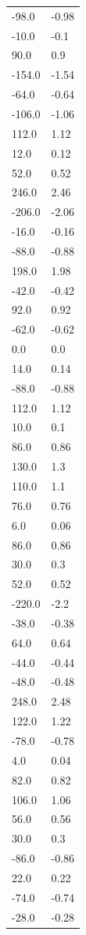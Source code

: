 \begin{longtable}{ll}
-98.0 & -0.98 \\
-10.0 & -0.1 \\
90.0 & 0.9 \\
-154.0 & -1.54 \\
-64.0 & -0.64 \\
-106.0 & -1.06 \\
112.0 & 1.12 \\
12.0 & 0.12 \\
52.0 & 0.52 \\
246.0 & 2.46 \\
-206.0 & -2.06 \\
-16.0 & -0.16 \\
-88.0 & -0.88 \\
198.0 & 1.98 \\
-42.0 & -0.42 \\
92.0 & 0.92 \\
-62.0 & -0.62 \\
0.0 & 0.0 \\
14.0 & 0.14 \\
-88.0 & -0.88 \\
112.0 & 1.12 \\
10.0 & 0.1 \\
86.0 & 0.86 \\
130.0 & 1.3 \\
110.0 & 1.1 \\
76.0 & 0.76 \\
6.0 & 0.06 \\
86.0 & 0.86 \\
30.0 & 0.3 \\
52.0 & 0.52 \\
-220.0 & -2.2 \\
-38.0 & -0.38 \\
64.0 & 0.64 \\
-44.0 & -0.44 \\
-48.0 & -0.48 \\
248.0 & 2.48 \\
122.0 & 1.22 \\
-78.0 & -0.78 \\
4.0 & 0.04 \\
82.0 & 0.82 \\
106.0 & 1.06 \\
56.0 & 0.56 \\
30.0 & 0.3 \\
-86.0 & -0.86 \\
22.0 & 0.22 \\
-74.0 & -0.74 \\
-28.0 & -0.28 \\

\end{longtable}
